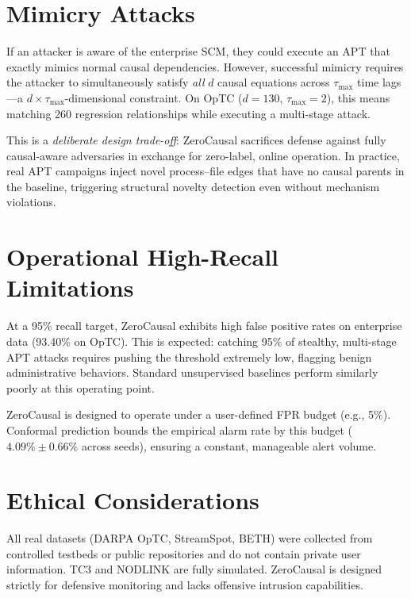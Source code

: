 \section{Mimicry Attacks}

If an attacker is aware of the enterprise SCM, they could execute an APT that exactly mimics normal causal dependencies. However, successful mimicry requires the attacker to simultaneously satisfy \textit{all} $d$ causal equations across $\tau_{\max}$ time lags---a $d \times \tau_{\max}$-dimensional constraint. On OpTC ($d = 130$, $\tau_{\max} = 2$), this means matching 260 regression relationships while executing a multi-stage attack.

This is a \textit{deliberate design trade-off}: ZeroCausal sacrifices defense against fully causal-aware adversaries in exchange for zero-label, online operation. In practice, real APT campaigns inject novel process--file edges that have no causal parents in the baseline, triggering structural novelty detection even without mechanism violations.

\section{Operational High-Recall Limitations}

At a 95\% recall target, ZeroCausal exhibits high false positive rates on enterprise data (93.40\% on OpTC). This is expected: catching 95\% of stealthy, multi-stage APT attacks requires pushing the threshold extremely low, flagging benign administrative behaviors. Standard unsupervised baselines perform similarly poorly at this operating point.

ZeroCausal is designed to operate under a user-defined FPR budget (e.g., 5\%). Conformal prediction bounds the empirical alarm rate by this budget ($4.09\% \pm 0.66\%$ across seeds), ensuring a constant, manageable alert volume.

\section{Ethical Considerations}

All real datasets (DARPA OpTC, StreamSpot, BETH) were collected from controlled testbeds or public repositories and do not contain private user information. TC3 and NODLINK are fully simulated. ZeroCausal is designed strictly for defensive monitoring and lacks offensive intrusion capabilities.
